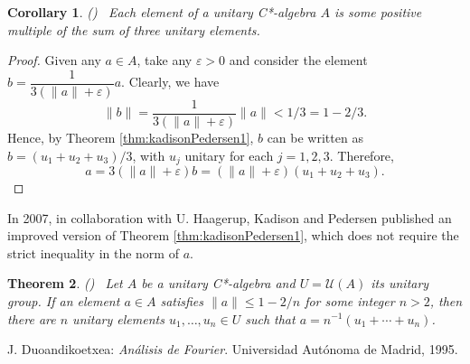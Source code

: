 \documentclass[12pt,english]{article}
\newtheorem{theorem}{Theorem}[section]
\newtheorem{corollary}[theorem]{Corollary}
\theoremstyle{definition}
\theoremstyle{remark}
\begin{document}
\begin{corollary} {\normalfont (\cite[Corollary 2]{kadison-pedersen 85})} \ Each element of a unitary C*-algebra $A$ is some positive multiple of the sum of three unitary elements.	
\end{corollary}

\begin{proof}
	Given any $a\in A$, take any $\varepsilon>0$ and consider the element $b=\dfrac{1}{3(\|a\|+\varepsilon)}a$. Clearly, we have
	\[\|b\|=\dfrac{1}{3(\|a\|+\varepsilon)}\|a\|<1/3=1-2/3.\]
	Hence, by Theorem \ref{thm:kadisonPedersen1}, $b$ can be written as $b=(u_1+u_2+u_3)/3$, with $u_j$ unitary for each $j=1,2,3$. Therefore, \[a=3(\|a\|+\varepsilon)b=(\|a\|+\varepsilon)(u_1+u_2+u_3).\]
\end{proof}

In 2007, in collaboration with U. Haagerup, Kadison and Pedersen published an improved version of Theorem \ref{thm:kadisonPedersen1}, which does not require the strict inequality in the norm of $a$.

\begin{theorem} \label{thm:kadisonPedersen2} {\normalfont (\cite[Theorem]{haagerup-kadison-pedersen 07})} \ 
	Let $A$ be a unitary C*-algebra and $U=\mathcal{U}(A)$ its unitary group. If an element $a\in A$ satisfies $\|a\|\leq 1-2/n$ for some integer $n>2$, then there are $n$ unitary elements $u_1,\ldots,u_n\in U$ such that $a=n^{-1}(u_1+\cdots+u_n)$.
\end{theorem}

\begin{thebibliography}{99}
 J. Duoandikoetxea: \emph{Análisis de Fourier}. Universidad Autónoma de Madrid, 1995.
\end{thebibliography}
\end{document}
